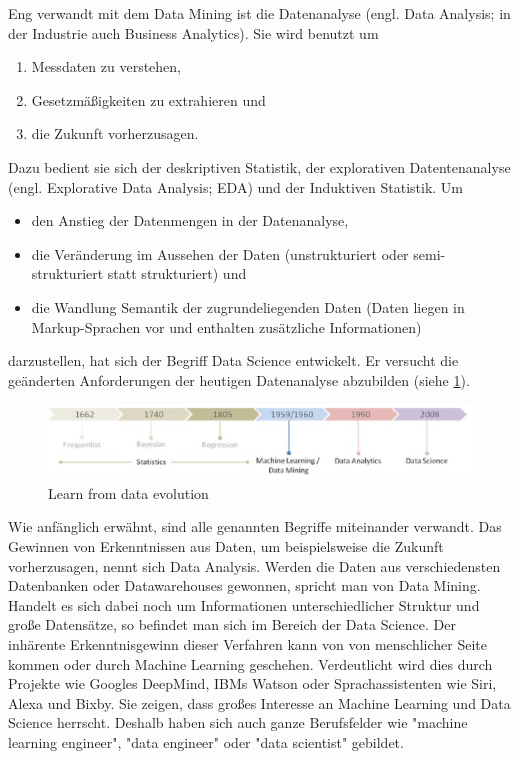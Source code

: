 Eng verwandt mit dem Data Mining ist die Datenanalyse (engl. Data Analysis; in der Industrie auch Business Analytics\citep[S.~58]{swamynathan_mastering_2017}). Sie wird benutzt um\citep[S.~2; Teil 1]{hertle_datenanalyse_2016}
\begin{enumerate}
\item Messdaten zu verstehen,
\item Gesetzmäßigkeiten zu extrahieren und
\item die Zukunft vorherzusagen.
\end{enumerate}
Dazu bedient sie sich der deskriptiven Statistik, der explorativen Datentenanalyse (engl. Explorative Data Analysis; EDA) und der Induktiven Statistik.\citep[S.~17]{hertle_datenanalyse_2016}\newline
Um 
\begin{itemize}
\item den Anstieg der Datenmengen in der Datenanalyse,
\item die Veränderung im Aussehen der Daten (unstrukturiert oder semi-strukturiert statt strukturiert) und
\item die Wandlung Semantik der zugrundeliegenden Daten (Daten liegen in Markup-Sprachen vor und enthalten zusätzliche Informationen)
\end{itemize}
darzustellen, hat sich der Begriff Data Science entwickelt.\citep{dhar_data_2013} Er versucht die geänderten Anforderungen der heutigen Datenanalyse abzubilden (siehe \ref{fig:dataEvolution}).
\begin{figure}[h]
\includegraphics[width=\textwidth]{images/LearnFromDataEvolution.png}
\caption{Learn from data evolution \citep[S.~66]{swamynathan_mastering_2017}}
\label{fig:dataEvolution}
\centering
\end{figure}
\newline
Wie anfänglich erwähnt, sind alle genannten Begriffe miteinander verwandt. Das Gewinnen von Erkenntnissen aus Daten, um beispielsweise die Zukunft vorherzusagen, nennt sich Data Analysis. Werden die Daten aus verschiedensten Datenbanken oder Datawarehouses gewonnen, spricht man von Data Mining. Handelt es sich dabei noch um Informationen unterschiedlicher Struktur und große Datensätze, so befindet man sich im Bereich der Data Science. Der inhärente Erkenntnisgewinn dieser Verfahren kann von von menschlicher Seite kommen oder durch Machine Learning geschehen.\newline
Verdeutlicht wird dies durch Projekte wie Googles DeepMind\citep{deepmind_technologies_limited_deepmind_2017}, IBMs Watson\citep{international_business_machines_corporation_ibm_ibm_2017} oder Sprachassistenten wie Siri, Alexa und Bixby. Sie zeigen, dass großes Interesse an Machine Learning und Data Science herrscht. Deshalb haben sich auch ganze Berufsfelder wie "machine learning engineer", "data engineer" oder "data scientist"\citep[S.~1]{ramasubramanian_machine_2017} gebildet.



